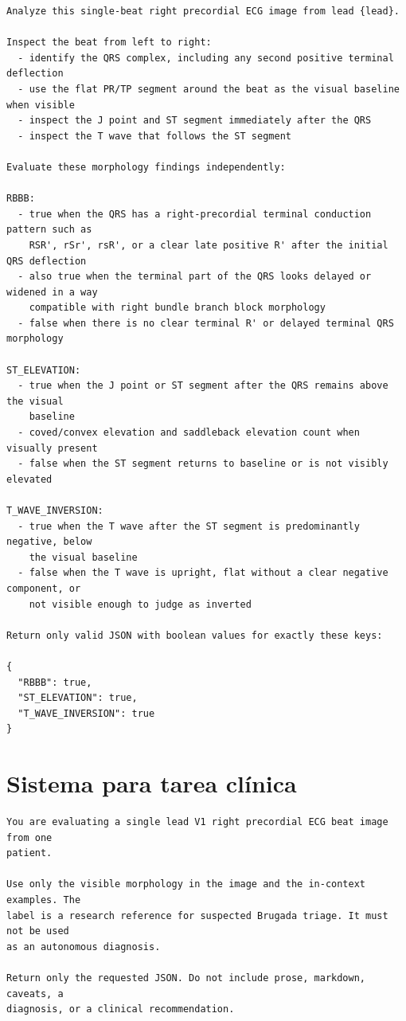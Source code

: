 \begin{lstlisting}
Analyze this single-beat right precordial ECG image from lead {lead}.

Inspect the beat from left to right:
  - identify the QRS complex, including any second positive terminal deflection
  - use the flat PR/TP segment around the beat as the visual baseline when visible
  - inspect the J point and ST segment immediately after the QRS
  - inspect the T wave that follows the ST segment

Evaluate these morphology findings independently:

RBBB:
  - true when the QRS has a right-precordial terminal conduction pattern such as
    RSR', rSr', rsR', or a clear late positive R' after the initial QRS deflection
  - also true when the terminal part of the QRS looks delayed or widened in a way
    compatible with right bundle branch block morphology
  - false when there is no clear terminal R' or delayed terminal QRS morphology

ST_ELEVATION:
  - true when the J point or ST segment after the QRS remains above the visual
    baseline
  - coved/convex elevation and saddleback elevation count when visually present
  - false when the ST segment returns to baseline or is not visibly elevated

T_WAVE_INVERSION:
  - true when the T wave after the ST segment is predominantly negative, below
    the visual baseline
  - false when the T wave is upright, flat without a clear negative component, or
    not visible enough to judge as inverted

Return only valid JSON with boolean values for exactly these keys:

{
  "RBBB": true,
  "ST_ELEVATION": true,
  "T_WAVE_INVERSION": true
}
\end{lstlisting}

\section{Sistema para tarea cl\'inica}

\begin{lstlisting}
You are evaluating a single lead V1 right precordial ECG beat image from one
patient.

Use only the visible morphology in the image and the in-context examples. The
label is a research reference for suspected Brugada triage. It must not be used
as an autonomous diagnosis.

Return only the requested JSON. Do not include prose, markdown, caveats, a
diagnosis, or a clinical recommendation.
\end{lstlisting}

